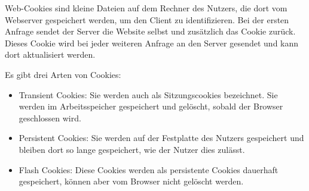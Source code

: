 
Web-Cookies sind kleine Dateien auf dem Rechner des Nutzers, die dort vom Webserver gespeichert werden, um den Client zu identifizieren. Bei der ersten Anfrage sendet der Server die Website selbst und zusätzlich das Cookie zurück. Dieses Cookie wird bei jeder weiteren Anfrage an den Server gesendet und kann dort aktualisiert werden. 

Es gibt drei Arten von Cookies:

\begin{itemize}
    \item Transient Cookies: Sie werden auch als Sitzungscookies bezeichnet. Sie werden im Arbeitsspeicher gespeichert und gelöscht, sobald der Browser geschlossen wird.
    \item Persistent Cookies: Sie werden auf der Festplatte des Nutzers gespeichert und bleiben dort so lange gespeichert, wie der Nutzer dies zulässt.
    \item Flash Cookies: Diese Cookies werden als persistente Cookies dauerhaft gespeichert, können aber vom Browser nicht gelöscht werden. 
\end{itemize}
\cite{w3Cookies}